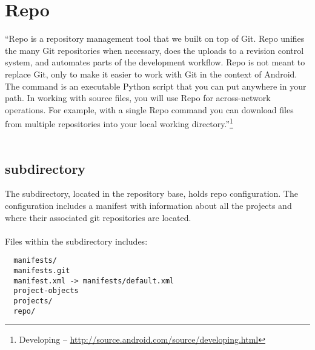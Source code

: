 
\newpage
\section{Repo}
``Repo is a repository management tool that we built on top of Git.
Repo unifies the many Git repositories when necessary, does the
uploads to a revision control system, and automates parts of the
development workflow.  Repo is not meant to replace Git, only to
make it easier to work with Git in the context of Android.  The
 command is an executable Python script that you can put
anywhere in your path.  In working with source files, you will use
Repo for across-network operations.  For example, with a single
Repo command you can download files from multiple repositories
into your local working directory.''\footnote{Developing -- \href{http://source.android.com/source/developing.html}{http://source.android.com/source/developing.html}}
\\
\\
\noindent {}



\subsection{ subdirectory}
The  subdirectory, located in the repository base,
holds repo configuration.  The configuration includes a manifest
with information about all the projects and where their associated git
repositories are located.
\\
\\
Files within the  subdirectory includes:
\begin{verbatim}
  manifests/
  manifests.git
  manifest.xml -> manifests/default.xml
  project-objects
  projects/
  repo/
\end{verbatim}
 
